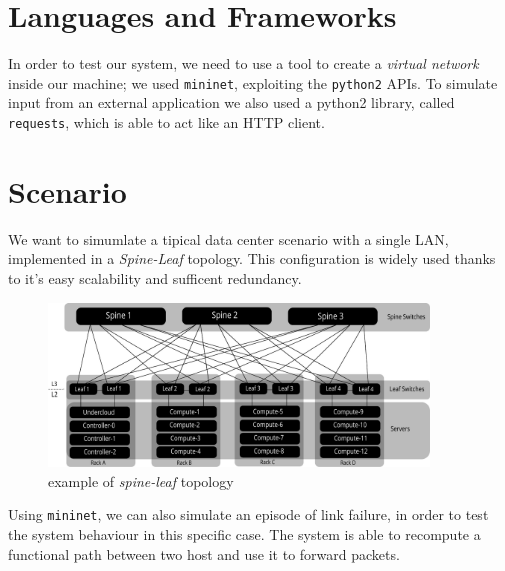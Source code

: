 \section*{Languages and Frameworks}
In order to test our system, we need to use a tool to create a \textit{virtual network} inside our machine; we used \texttt{mininet}, 
exploiting the \texttt{python2} APIs. To simulate input from an external application we also used a python2 library, called \texttt{requests},
which is able to act like an HTTP client.

\section{Scenario}
We want to simumlate a tipical data center scenario with a single LAN, implemented in a \textit{Spine-Leaf} topology. This configuration
is widely used thanks to it's easy scalability and sufficent redundancy.
\begin{figure}[h]
    \caption{example of \textit{spine-leaf} topology}
    \includegraphics[width=0.90\textwidth]{img/spine_leaf.pdf}
\end{figure}

Using \texttt{mininet}, we can also simulate an episode of link failure, in order to test the system behaviour in this specific case. The system is able to
recompute a functional path between two host and use it to forward packets.
